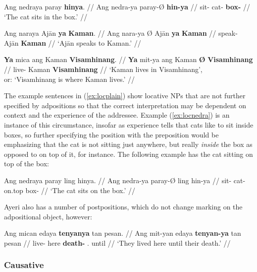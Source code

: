 \pex\label{ex:locplain}
\a\label{ex:locnedra}\begingl
	\gla Ang nedraya paray \textbf{hinya}. //
	\glb Ang nedra-ya paray-Ø \textbf{hin-ya} //
	\glc \AgtT{} sit-\TsgM{} cat-\Top{} \textbf{box-\Loc{}} //
	\glft `The cat sits in the box.' //
\endgl

\a\label{ex:locnara}\begingl
	\gla Ang naraya {} Ajān \textbf{ya} \textbf{Kaman}. //
	\glb Ang nara-ya Ø Ajān \textbf{ya} \textbf{Kaman} //
	\glc \AgtT{} speak-\TsgM{} \Top{} Ajān \textbf{\Loc{}} \textbf{Kaman} //
	\glft `Ajān speaks to Kaman.' //
\endgl

\a\label{ex:locmit}\begingl
	\gla \textbf{Ya} mica ang Kaman \textbf{{}} \textbf{Visamhinang}. //
	\glb \textbf{Ya} mit-ya ang Kaman \textbf{Ø} \textbf{Visamhinang} //
	\glc \textbf{\LocT{}} live-\TsgM{} \Aarg{} Kaman \textbf{\Top{}} 
		\textbf{Visamhinang} //
	\glft `Kaman lives in Visamhinang',\\
		or: `Visamhinang is where Kaman lives.' //
\endgl

\xe

The example sentences in (\ref{ex:locplain}) show locative NPs that are not 
further specified by adpositions so that the correct interpretation may be 
dependent on context and the experience of the addressee. Example 
(\ref{ex:locnedra}) is an instance of this circumstance, insofar as experience 
tells that cats like to sit inside boxes, so further specifying the position 
with the preposition  would be emphasizing that the 
cat is not sitting just anywhere, but really \emph{inside} the box as opposed to 
on top of it, for instance. The following example has the cat sitting on top of 
the box:

\ex\begingl
	\gla Ang nedraya paray ling hinya. //
	\glb Ang nedra-ya paray-Ø ling hin-ya //
	\glc \AgtT{} sit-\TsgM{} cat-\Top{} on.top box-\Loc{} //
	\glft `The cat sits on the box.' //
\endgl\xe

Ayeri also has a number of postpositions, which do not change marking on the 
adpositional object, however:

\ex\begingl
	\gla Ang mican edaya \textbf{tenyanya} tan pesan. //
	\glb Ang mit-yan edaya \textbf{tenyan-ya} tan pesan //
	\glc \AgtT{} live-\TplM{} here \textbf{death-\Loc{}} \TplM{}.\Gen{} 
		until //
	\glft `They lived here until their death.' //
\endgl\xe


\subsubsection{Causative}

